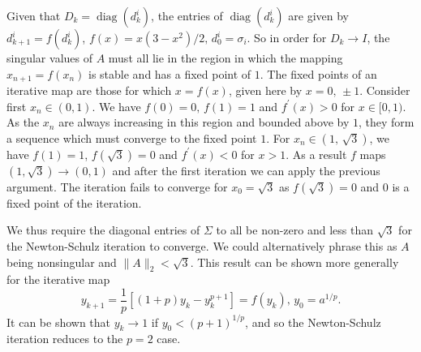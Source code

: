 \documentclass[12pt]{article}
\def\norm#1{\|#1\|}
\def\diag{\mathop{\mathrm{diag}}}     %
\begin{document}
Given that $D_k = \diag(d_k^i)$, the entries of $\diag(d_k^{i})$ are given by
$d^{i}_{k+1} = f(d^{i}_k)$, $f(x) = x(3-x^2)/2\text{, } d_0^{i} = \sigma_i$. So
in order for $D_k \to I$, the singular values of $A$ must all lie in the region
in which the mapping $x_{n+1} = f(x_n)$ is stable and has a fixed point of $1$.
The fixed points of an iterative map are those for which $x = f(x)$, given here
by $x = 0\text{, }\pm 1$.
Consider first $x_n \in (0, 1)$.
We have $f(0) = 0\text{, } f(1) = 1$ and $f^{\prime}(x) > 0$ for $x \in [0, 1)$.
As the $x_n$ are always increasing in this region and bounded above by $1$, they
form a sequence which must converge to the fixed point $1$.
For $x_n \in (1\text{, } \sqrt{3})$, we have $f(1) = 1$,
$f(\sqrt{3}) = 0$ and $f^{\prime}(x) < 0$ for $x > 1$.
As a result $f$ maps $(1, \sqrt{3}) \to (0, 1)$ and after the first iteration
we can apply the previous argument.
The iteration fails to converge for $x_0 = \sqrt{3}$ as $f(\sqrt{3}) = 0$ and
$0$ is a fixed point of the iteration.

We thus require the diagonal entries of $\Sigma$ to all be non-zero and less
than $\sqrt{3}$ for the Newton-Schulz iteration to converge. We could
alternatively phrase this as $A$ being nonsingular and $\norm{A}_2 < \sqrt{3}$.
This result can be shown more generally for the iterative map
\begin{equation}
  y_{k+1} = \frac{1}{p}[(1+p)y_k - y_k^{p+1}] = f(y_k)
  \text{, } y_0 = a^{1/p}\text{.}  
\end{equation}
It can be shown \cite[p.~182]{Higham:2008:FM} that $y_k \to 1$ if $y_0 < (p+1)^{1/p}$,
and so the Newton-Schulz iteration reduces to the $p=2$ case.
\end{document}
